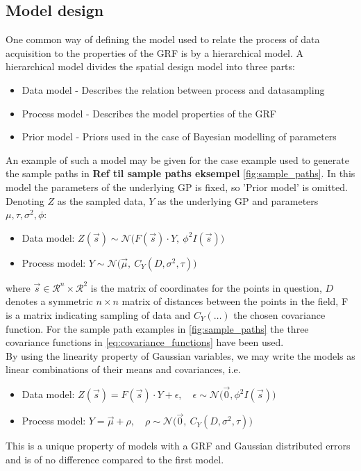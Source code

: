 \subsection{Model design} \label{model:hm}
One common way of defining the model used to relate the process of data acquisition to the properties of the GRF is by a hierarchical model. A hierarchical model divides the spatial design model 
into three parts: 
\begin{itemize}
\item Data model - Describes the relation between process and datasampling
\item Process model - Describes the model properties of the GRF 
\item Prior model - Priors used in the case of Bayesian modelling of parameters
\end{itemize}

An example of such a model may be given for the case example used to generate the sample paths in \textbf{Ref til sample paths eksempel} \ref{fig:sample_paths}. In this model the parameters of the underlying GP is fixed, so 'Prior model' is omitted. Denoting $Z$ as the sampled data, $Y$ as the underlying GP and parameters $\mu, \tau, \sigma^2, \phi$:
\begin{itemize}
\item Data model: $Z(\vec{s}) \sim \mathcal{N}\big(F(\vec{s}) \cdot Y, \ \phi^2I(\vec{s})\big)$
\item Process model: $Y \sim \mathcal{N}\big( \vec{\mu}, \ C_Y(D, \sigma^2, \tau) \big)$ 
\end{itemize}
where $\vec{s} \in \mathcal{R}^n \times \mathcal{R}^2$ is the matrix of coordinates for the points in question, $D$ denotes a symmetric $n \times n$ matrix of distances between the points in the field, F is a matrix indicating sampling of data and $C_Y(\dots)$ the chosen covariance function. For the sample path examples in \ref{fig:sample_paths} the three covariance functions in \ref{eq:covariance_functions} have been used. \\

By using the linearity property of Gaussian variables, we may write the models as linear combinations of their means and covariances, i.e. 
\begin{itemize}
\item Data model: $Z(\vec{s}) = F(\vec{s}) \cdot Y + \epsilon, \quad \epsilon \sim \mathcal{N} \big(\vec{0},\phi^2I(\vec{s}) \big)$
\item Process model: $Y = \vec{\mu} + \rho, \quad \rho \sim \mathcal{N} \big(\vec{0}, \ C_Y(D, \sigma^2, \tau ) \big) $ 
\end{itemize}
This is a unique property of models with a GRF and Gaussian distributed errors and is of no difference compared to the first model.

